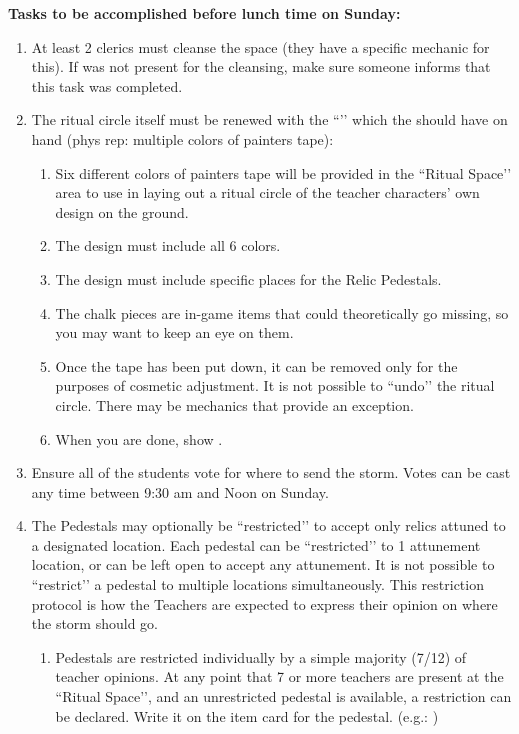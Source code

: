 \documentclass[green]{GL2020}
\begin{document}
\textbf{Tasks to be accomplished before lunch time on Sunday:}
\begin{enumerate}
  \item At least 2 clerics must cleanse the space (they have a specific mechanic for this). If \cPrincipal{} was not present for the cleansing, make sure someone informs \cPrincipal{\them} that this task was completed.
  \item The ritual circle itself must be renewed with the ``\iChalk{}’' which the \cPrincipal{} should have on hand (phys rep: multiple colors of painters tape):
  \begin{enumerate}
    \item Six different colors of painters tape will be provided in the ``Ritual Space’’ area to use in laying out a ritual circle of the teacher characters’ own design on the ground. 
    \item The design must include all 6 colors.
    \item The design must include specific places for the Relic Pedestals.
    \item The chalk pieces are in-game items that could theoretically go missing, so you may want to keep an eye on them.
    \item Once the tape has been put down, it can be removed only for the purposes of cosmetic adjustment. It is not possible to ``undo’’ the ritual circle. There may be mechanics that provide an exception.
    \item When you are done, show \cPrincipal{}.
  \end{enumerate}
  \item Ensure all of the students vote for where to send the storm. Votes can be cast any time between 9:30 am and Noon on Sunday.
    \item The Pedestals may optionally be ``restricted’’ to accept only relics attuned to a designated location. Each pedestal can be ``restricted’’ to 1 attunement location, or can be left open to accept any attunement. It is not possible to ``restrict’’ a pedestal to multiple locations simultaneously. This restriction protocol is how the Teachers are expected to express their opinion on where the storm should go.
\begin{enumerate}
	\item Pedestals are restricted individually by a simple majority (7/12) of teacher opinions. At any point that 7 or more teachers are present at the ``Ritual Space’’, and an unrestricted pedestal is available, a restriction can be declared. Write it on the item card for the pedestal. (e.g.: \pFarm{})

\end{enumerate}
\end{enumerate}
\end{document}

